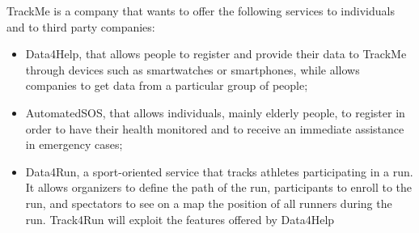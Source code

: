 TrackMe is a company that wants to offer the following services to individuals and to third party companies:
\begin{itemize}

\item Data4Help, that allows people to register and provide their data to TrackMe through devices such as smartwatches or smartphones, while allows companies to get data from a particular group of people;

\item AutomatedSOS, that allows individuals, mainly elderly people, to register in order to have their health monitored and to receive an immediate assistance in emergency cases;

\item Data4Run, a sport-oriented service that tracks athletes participating in a run. It allows organizers to define the path of the run, participants to enroll to the run, and spectators to see on a map the position of all runners during the run. Track4Run will exploit the features offered by Data4Help

\end{itemize}